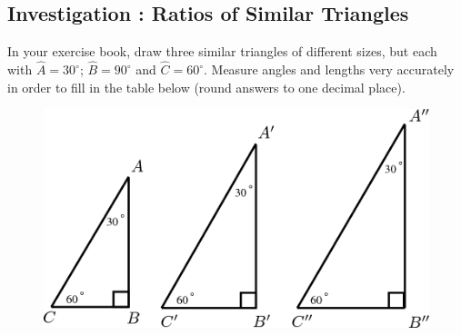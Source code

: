             \subsection{  Investigation : Ratios of Similar Triangles }
            \nopagebreak
      \label{m39405*id78516}In your exercise book, draw three similar triangles of different sizes, but each with \begin{math}\hat{A}={30}^{\circ }\end{math}; \begin{math}\hat{B}={90}^{\circ }\end{math} and \begin{math}\hat{C}={60}^{\circ }\end{math}. Measure angles and lengths very accurately in order to fill in the table below (round answers to one decimal place).\par 
      \label{m39405*id78597}
    \setcounter{subfigure}{0}
	\begin{figure}[H] %
    \begin{center}
    \label{m39405*id78598!!!underscore!!!media}\label{m39405*id78598!!!underscore!!!printimage}\includegraphics{col11306.imgs/m39405_MG10C15_002.png} %
      \vspace{2pt}
    \vspace{.1in}
    \end{center}
 \end{figure}       
      \par 
